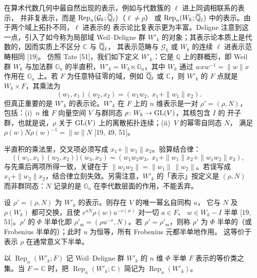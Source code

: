 在算术代数几何中最自然出现的表示，例如与代数簇的 $\ell$ 进上同调相联系的表示，
并非复表示，而是 $\operatorname{Rep}_n(\mathcal{G}_k;\overline{\mathbb{Q}}_\ell)$（$\ell\neq p$）
或 $\operatorname{Rep}_n(W_k;\overline{\mathbb{Q}}_\ell)$ 中的表示。由于两个域上拓扑不同，$\ell$ 进表示的
表示论比复表示更为丰富。Deligne 注意到这一点，引入了如今称为局部域 Weil--Deligne 群
$W'_k$ 的对象；其表示论本质上是代数的，因而实质上不区分 $\mathbb{C}$ 与 $\overline{\mathbb{Q}}_\ell$，
其表示范畴与 $\mathcal{G}_k$ 或 $W_k$ 的连续 $\ell$ 进表示范畴相同 [19]。
仿照 Tate [51]，我们如下定义 $W'_k$：它是 $\mathbb{Q}$ 上的群概形，即 Weil 群 $W_k$
与加法群 $\mathbb{G}_a$ 的半直积，$W'_k=W_k\ltimes\mathbb{G}_a$，其中 $W_k$ 通过
$wxw^{-1}=\|w\|x$ 作用在 $\mathbb{G}_a$ 上。若 $F$ 为任意特征零的域，例如 $\overline{\mathbb{Q}}_\ell$
或 $\mathbb{C}$，则 $W'_k$ 的 $F$ 点就是 $W_k\times F$，其乘法为
\[
  (w_1,x_1)(w_2,x_2)=(w_1w_2,\;x_1+\|w_1\|x_2).
\]
但真正重要的是 $W'_k$ 的表示论。$W'_k$ 在 $F$ 上的 $n$ 维表示是一对 $\rho'=(\rho,N)$，
包括：(i)~$n$ 维 $F$ 向量空间 $V$ 与群同态 $\rho\colon W_k\to\mathrm{GL}(V)$，其核包含 $I$ 的
开子群，也就是说，$\rho$ 关于 $\mathrm{GL}(V)$ 上的离散拓扑连续；(ii)~$V$ 的幂零自同态 $N$，
满足 $\rho(w)N\rho(w)^{-1}=\|w\|N$ [19, 49, 51]。
\begin{annote}
半直积的乘法里，交叉项必须写成 $x_1+\|w_1\|x_2$。验算结合律：
\[
  \bigl((w_1,x_1)(w_2,x_2)\bigr)(w_3,x_3)
  =(w_1w_2w_3,\;x_1+\|w_1\|x_2+\|w_1w_2\|x_3),
\]
与先乘后两项所得一致，关键在于 $\|w_1w_2\|=\|w_1\|\,\|w_2\|$。若误写成
$x_1+\|w_2\|x_2$，结合律立刻失效。另需注意，$W'_k$ 的「表示」按定义是 $(\rho,N)$
而非群同态：$N$ 记录的是 $\mathbb{G}_a$ 在李代数层面的作用，不能丢弃。
\par{}
\end{annote}

设 $\rho'=(\rho,N)$ 为 $W'_k$ 的表示。则存在 $V$ 的唯一幂幺自同构 $u$，
它与 $N$ 及 $\rho(W_k)$ 都可交换，且使 $e^{aN}\rho(w)u^{-v(w)}$ 对一切 $a\in F$、
$w\in W_k-I$ 半单 [19, 51]。$\rho'$ 的 $\Phi$ 半单化即
$\rho'_{\mathrm{ss}}=(\rho u^{-v},N)$。若 $\rho'=\rho'_{\mathrm{ss}}$，则称 $\rho'$
为 $\Phi$ 半单的（或 Frobenius 半单的）；此时 $u$ 为恒等，所有 Frobenius 元都半单地作用。
这等价于表示 $\rho$ 在通常意义下半单。

以 $\operatorname{Rep}_n(W'_k;F)$ 记 Weil--Deligne 群 $W'_k$ 的 $n$ 维 $\Phi$ 半单
$F$ 表示的等价类之集。当 $F=\mathbb{C}$ 时，把
$\operatorname{Rep}_n(W'_k;\mathbb{C})$ 简记为 $\operatorname{Rep}_n(W'_k)$。

